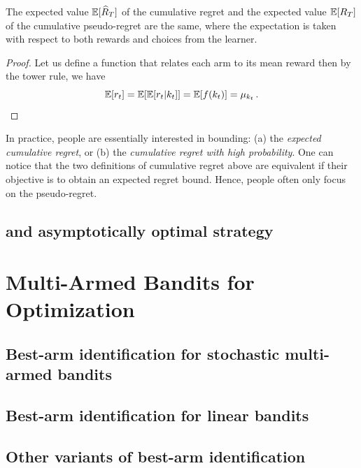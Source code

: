 \begin{proposition}\label{prop:mab.pseudo_regret}
\begin{leftbar}[propositionbar]
	The expected value $\mathbb{E}[\widehat{R}_T]$ of the cumulative regret and the expected value $\mathbb{E}[R_T]$ of the cumulative pseudo-regret are the same, where the expectation is taken with respect to both rewards and choices from the learner.
\end{leftbar}
\end{proposition}

\begin{proof}
	Let us define a function that relates each arm to its mean reward  then by the tower rule, we have
    \[
	    \mathbb{E}[r_t] = \mathbb{E}[\mathbb{E}[r_t|k_t]] = \mathbb{E}[f(k_t)] = \mu_{k_t}\,.
    \]
\end{proof}

In practice, people are essentially interested in bounding: (a) the \emph{expected cumulative regret}, or (b) the \emph{cumulative regret with high probability}. One can notice that the two definitions of cumulative regret above are equivalent if their objective is to obtain an expected regret bound. Hence, people often only focus on the pseudo-regret. 


\subsection{\UCB{} and asymptotically optimal strategy}\label{sec:mab.model.ucb}

\section{Multi-Armed Bandits for Optimization}\label{sec:mab.optim}

\subsection{Best-arm identification for stochastic multi-armed bandits}

\subsection{Best-arm identification for linear bandits}

\subsection{Other variants of best-arm identification}

